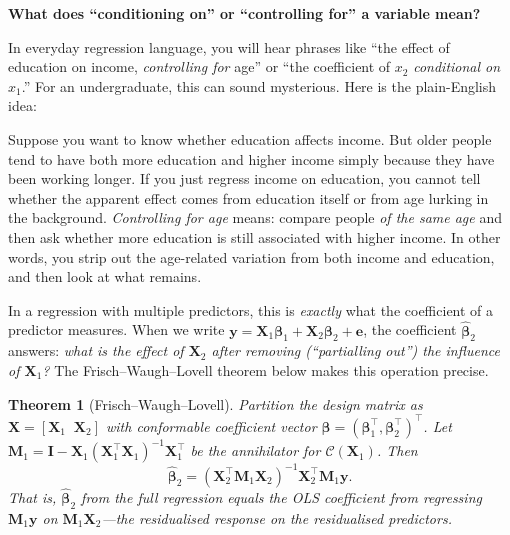 \documentclass[11pt,a4paper]{article}
\theoremstyle{plain}
\newtheorem{theorem}{Theorem}[section]
\theoremstyle{definition}
\newcommand{\bhat}{\hat{\bm{\beta}}}
\newcommand{\bX}{\bm{X}}
\newcommand{\by}{\bm{y}}
\newcommand{\be}{\bm{e}}
\newcommand{\bM}{\bm{M}}
\newcommand{\bI}{\bm{I}}
\newcommand{\Col}{\mathcal{C}}
\begin{document}
\noindent\textbf{What does ``conditioning on'' or ``controlling for'' a variable mean?}

In everyday regression language, you will hear phrases like
``the effect of education on income, \emph{controlling for} age'' or
``the coefficient of $x_2$ \emph{conditional on} $x_1$.''
For an undergraduate, this can sound mysterious.
Here is the plain-English idea:

Suppose you want to know whether education affects income.
But older people tend to have both more education and higher income simply because they have been working longer.
If you just regress income on education, you cannot tell whether the apparent effect comes from education itself or from age lurking in the background.
\emph{Controlling for age} means: compare people \emph{of the same age} and then ask whether more education is still associated with higher income.
In other words, you strip out the age-related variation from both income and education, and then look at what remains.

In a regression with multiple predictors, this is \emph{exactly} what the
coefficient of a predictor measures. When we write
$\by = \bX_1\bm{\beta}_1 + \bX_2\bm{\beta}_2 + \be$,
the coefficient $\bhat_2$ answers: \emph{what is the effect of $\bX_2$
after removing (``partialling out'') the influence of $\bX_1$?}
The Frisch--Waugh--Lovell theorem below makes this operation precise.

\begin{theorem}[Frisch--Waugh--Lovell]\label{thm:fwl}
Partition the design matrix as $\bX = [\bX_1\;\;\bX_2]$
with conformable coefficient vector $\bm{\beta}=(\bm{\beta}_1^\top,\bm{\beta}_2^\top)^\top$.
Let $\bM_1 = \bI - \bX_1(\bX_1^\top\bX_1)^{-1}\bX_1^\top$ be the
annihilator for $\Col(\bX_1)$.
Then
\begin{equation}\label{eq:fwl}
  \bhat_2 = (\bX_2^\top\bM_1\bX_2)^{-1}\bX_2^\top\bM_1\by.
\end{equation}
That is, $\bhat_2$ from the full regression equals the OLS coefficient
from regressing $\bM_1\by$ on $\bM_1\bX_2$---the
\emph{residualised} response on the \emph{residualised} predictors.
\end{theorem}
\end{document}
